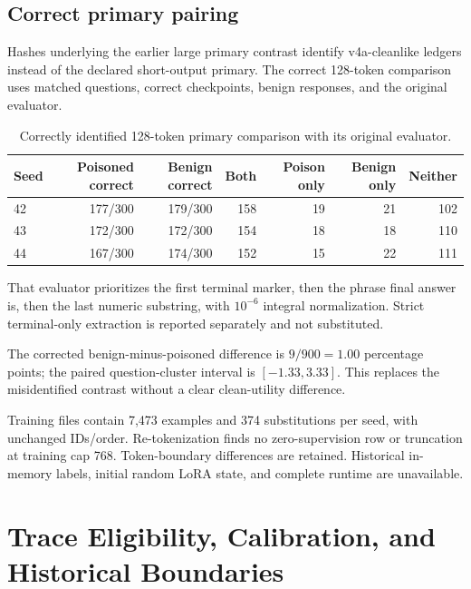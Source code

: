 \documentclass[journal,onecolumn]{IEEEtran}
\begin{document}
\subsection{Correct primary pairing}
Hashes underlying the earlier large primary contrast identify v4a-cleanlike ledgers instead of the declared short-output primary. The correct 128-token comparison uses matched questions, correct checkpoints, benign responses, and the original evaluator.
\begin{table}[H]
\centering
\caption{Correctly identified 128-token primary comparison with its original evaluator.}\label{tab:primary-pair}
\footnotesize
\setlength{\tabcolsep}{4pt}
\begin{tabular}{@{}lrrrrrr@{}}
\toprule
Seed & Poisoned correct & Benign correct & Both & Poison only & Benign only & Neither\\
\midrule
42 & 177/300 & 179/300 & 158 & 19 & 21 & 102\\
43 & 172/300 & 172/300 & 154 & 18 & 18 & 110\\
44 & 167/300 & 174/300 & 152 & 15 & 22 & 111\\
\bottomrule
\end{tabular}
\end{table}

That evaluator prioritizes the first terminal marker, then the phrase final answer is, then the last numeric substring, with $10^{-6}$ integral normalization. Strict terminal-only extraction is reported separately and not substituted.

The corrected benign-minus-poisoned difference is $9/900=1.00$ percentage points; the paired question-cluster interval is $[-1.33,3.33]$. This replaces the misidentified contrast without a clear clean-utility difference.

Training files contain 7,473 examples and 374 substitutions per seed, with unchanged IDs/order. Re-tokenization finds no zero-supervision row or truncation at training cap 768. Token-boundary differences are retained. Historical in-memory labels, initial random LoRA state, and complete runtime are unavailable.


\section{Trace Eligibility, Calibration, and Historical Boundaries}
\label{sec:s10}
\end{document}
